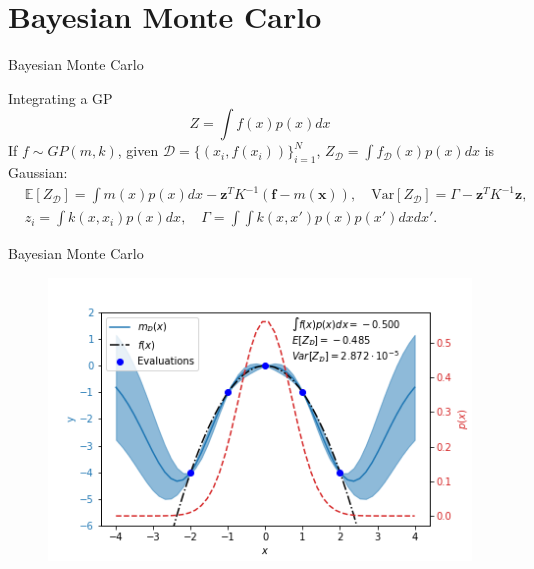 \documentclass[pdf]{beamer}
\def \Ev {{\mathbb E}}
\newcommand{\Var}{\mathrm{Var}}
\begin{document}
\section{Bayesian Monte Carlo}
\begin{frame}{Bayesian Monte Carlo}
\begin{block}{Integrating a GP}
\begin{equation*}
 Z = \int f(x) p(x) dx
\end{equation*}
If $f \sim GP(m,k)$, given $\mathcal{D} = \{(x_i,f(x_i))\}_{i=1}^N$, $Z_\mathcal{D} = \int f_\mathcal{D}(x) p(x) dx$ is Gaussian:
\begin{equation*}
\begin{split}
& \Ev[Z_{\mathcal{D}}] = \int m(x) p(x) dx - \mathbf{z}^T K^{-1} (\mathbf{f}-m(\mathbf{x})), \quad
\Var[Z_{\mathcal{D}}] = \Gamma - \mathbf{z}^T K^{-1} \mathbf{z}, \\
& z_i = \int k(x,x_i) p(x) dx, \quad \Gamma = \int \int k(x,x') p(x) p(x') dx dx'.
\end{split}
\end{equation*}
\pause
\begin{block}{}
\pause

\end{block}
\end{block}
\end{frame}
\begin{frame}{Bayesian Monte Carlo}
\begin{figure}
	\centering
	\includegraphics[width=0.8\linewidth]{figs/exbmc.png}
\end{figure}
\end{frame}
\end{document}
